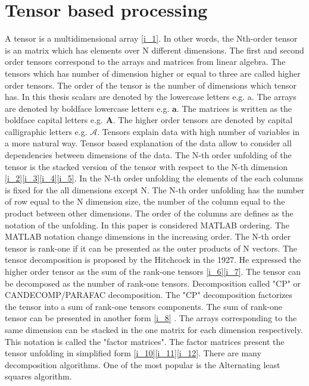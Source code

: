 \section{Tensor based processing}\label{sec:TBP}
A tensor is a multidimensional array \eqref{i_1}\cite{Book6}. In other words, the Nth-order tensor is an matrix which has elements over N different dimensions. The first and second order tensors correspond to the arrays and matrices from linear algebra\cite{Book12}. The tensors which has number of dimension higher or equal to three are called higher order tensors. 
The order of the tensor is the number of dimensions which tensor has. In this thesis scalars are denoted by the lowercase letters e.g. a. The arrays are denoted by boldface lowercase letters e.g. $\mathbf{a}$. The matrices is written as the boldface capital letters e.g. $\mathbf{A}$. The higher order tensors are denoted by capital calligraphic letters e.g. $\mathcal{A}$.
Tensors explain data with high number of variables in a more natural way. Tensor based explanation of the data allow to consider all dependencies between dimensions of the data. 
The N-th order unfolding of the tensor is the stacked version of the tensor with respect to the N-th dimension \eqref{i_2}\eqref{i_3}\eqref{i_4}\eqref{i_5}\cite{Book16}. In the N-th order unfolding the elements of the each columns is fixed for the all dimensions except N. The N-th order unfolding has the number of row equal to the N dimension size, the number of the column equal to the product between other dimensions. The order of the columns are defines as the notation of the unfolding. In this paper is considered MATLAB ordering\cite{Book19}. The MATLAB notation change dimensions in the increasing order.
The N-th order tensor is rank-one if it can be presented as the outer products of N vectors.
The tensor decomposition is proposed by the Hitchcock in the 1927. He expressed the higher order tensor as the sum of the rank-one tensors \eqref{i_6}\eqref{i_7}.
The  tensor can be decomposed as the number of rank-one tensors. Decomposition called "CP" or CANDECOMP/PARAFAC decomposition\cite{Book6}. The "CP" decomposition factorizes the tensor into a sum of rank-one tensors components. The sum of rank-one tensor can be presented in another form \eqref{i_8} . The arrays corresponding to the same dimension can be stacked in the one matrix for each dimension respectively. This notation is called the "factor matrices". The factor matrices present the tensor unfolding in simplified form \eqref{i_10}\eqref{i_11}\eqref{i_12}.
There are many decomposition algorithms. One of the most popular is the Alternating least squares algorithm. 

